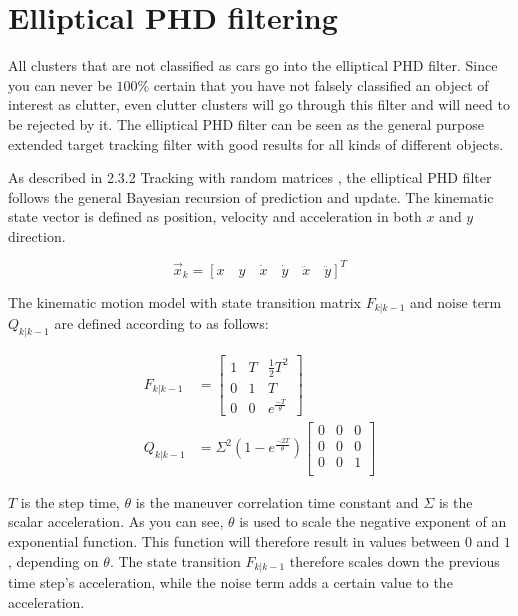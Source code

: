 \section{Elliptical PHD filtering}

All clusters that are not classified as cars go into the elliptical PHD filter. Since you can never be $100\%$ certain that you have not falsely classified an object of interest as clutter, even clutter clusters will go through this filter and will need to be rejected by it. The elliptical PHD filter can be seen as the general purpose extended target tracking filter with good results for all kinds of different objects. 

As described in 2.3.2 Tracking with random matrices , the elliptical PHD filter follows the general Bayesian recursion of prediction and update. The kinematic state vector is defined as position, velocity and acceleration in both $x$ and $y$ direction.

\begin{equation}
    \vec{x}_k = [x\quad y\quad \dot{x}\quad \dot{y}\quad \ddot{x}\quad \ddot{y}]^T
\end{equation}

The kinematic motion model with state transition matrix $F_{k|k-1}$ and noise term $Q_{k|k-1}$ are defined according to \cite{koch2008elliptical} as follows:

\begin{equation}
    \begin{split}
        F_{k|k-1} &= \begin{bmatrix} 
            1 & T & \frac{1}{2}T^2 \\
            0 & 1 & T \\
            0 & 0 & e^\frac{-T}{\theta}
            \end{bmatrix}\\
        Q_{k|k-1} &= \Sigma^2(1-e^\frac{-2T}{\theta}) \begin{bmatrix}
            0 & 0 & 0 \\
            0 & 0 & 0 \\
            0 & 0 & 1 \\
            \end{bmatrix}
    \end{split}
\end{equation}

$T$ is the step time, $\theta$ is the maneuver correlation time constant and $\Sigma$ is the scalar acceleration. As you can see, $\theta$ is used to scale the negative exponent of an exponential function. This function will therefore result in values between $0$ and $1$, depending on $\theta$. The state transition $F_{k|k-1}$ therefore scales down the previous time step's acceleration, while the noise term adds a certain value to the acceleration.

